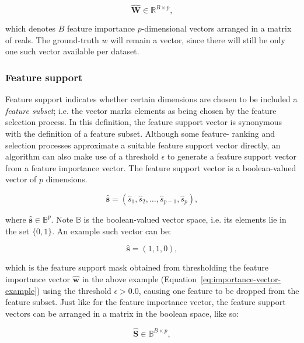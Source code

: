\documentclass{article}
\begin{document}
\begin{equation}\label{eq:feature-importance-matrix}
\mathbf{\hat{W}} \in \mathbb{R}^{B \times p},
\end{equation}

which denotes $B$ feature importance $p$-dimensional vectors arranged in a matrix of reals. The ground-truth $w$ will remain a vector, since there will still be only one such vector available per dataset.

\subsubsection{Feature support}\label{section:feature-support-definition}
Feature support indicates whether certain dimensions are chosen to be included a \textit{feature subset}; i.e. the vector marks elements as being chosen by the feature selection process. In this definition, the feature support vector is synonymous with the definition of a feature subset. Although some feature- ranking and selection processes approximate a suitable feature support vector directly, an algorithm can also make use of a threshold $\epsilon$ to generate a feature support vector from a feature importance vector. The feature support vector is a boolean-valued vector of $p$ dimensions.

\begin{equation}
\hat{\boldsymbol{s}} = (\hat{s}_1, \hat{s}_2, \ldots, \hat{s}_{p-1}, \hat{s}_p),
\end{equation}

where $\hat{\boldsymbol{s}} \in \mathbb{B}^p$. Note $\mathbb{B}$ is the boolean-valued vector space, i.e. its elements lie in the set $\{0, 1\}$. An example such vector can be:

\begin{equation}\label{eq:support-vector-example}
\hat{\boldsymbol{s}} = (1, 1, 0),
\end{equation}

which is the feature support mask obtained from thresholding the feature importance vector $\hat{\boldsymbol{w}}$ in the above example (Equation~\ref{eq:importance-vector-example}) using the threshold $\epsilon > 0.0$, causing one feature to be dropped from the feature subset. Just like for the feature importance vector, the feature support vectors can be arranged in a matrix in the boolean space, like so:

\begin{equation}\label{eq:feature-support-matrix}
\mathbf{\hat{S}} \in \mathbb{B}^{B \times p},
\end{equation}
\end{document}
